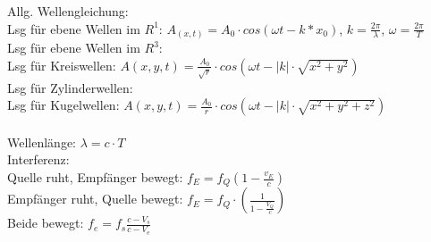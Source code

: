 \documentclass[A4]{scrreprt}
\begin{document}
  
  Allg. Wellengleichung:\\
  Lsg für ebene Wellen im $R^1$: $A_{(x,t)} = A_0\cdot cos(\omega t - k*x_0)$, $k = \frac{2\pi}{\lambda}$, $\omega = \frac{2\pi}{T}$\\
  Lsg für ebene Wellen im $R^3$: \\
  Lsg für Kreiswellen: $A(x,y,t) = \frac{A_0}{\sqrt{r}}\cdot cos(\omega t - |k|\cdot\sqrt{x^2+y^2})$\\
  Lsg für Zylinderwellen: \\
  Lsg für Kugelwellen: $A(x,y,t) = \frac{A_0}{r}\cdot cos(\omega t - |k|\cdot \sqrt{x^2+y^2+z^2})$\\
  \\
  Wellenlänge: $\lambda = c\cdot T$\\  

  Interferenz:\\

  Quelle ruht, Empfänger bewegt: $f_E = f_Q (1-\frac{v_E}{c})$\\
  Empfänger ruht, Quelle bewegt: $f_E = f_Q\cdot(\frac{1}{1-\frac{V_Q}{c}})$\\
  Beide bewegt: $f_e=f_s\frac{c-{V_s}}{c-{V_e}}$

  \addsec{}
\end{document}
